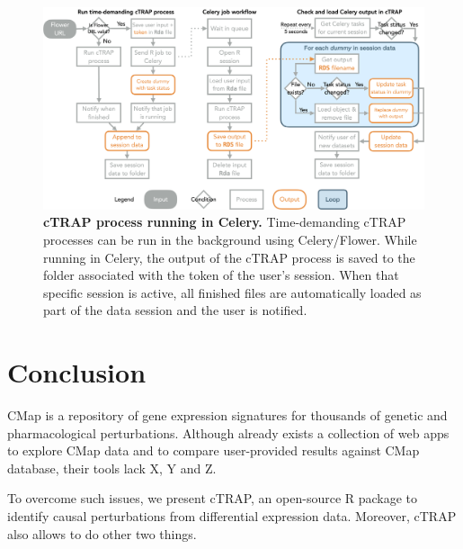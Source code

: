 \begin{figure}[!htb]
  \includegraphics[width=\textwidth]{images/ctrap/celery-job}
  \centering
  \caption[cTRAP process running in Celery]{\textbf{cTRAP process running in Celery.} Time-demanding cTRAP processes can be run in the background using Celery/Flower. While running in Celery, the output of the cTRAP process is saved to the folder associated with the token of the user's session. When that specific session is active, all finished files are automatically loaded as part of the data session and the user is notified.}
  \label{fig:ctrap-celery}
\end{figure}

\section{Conclusion}


CMap is a repository of gene expression signatures for thousands of genetic and pharmacological perturbations. Although  already exists a collection of web apps to explore CMap data and to compare user-provided results against CMap database, their tools lack X, Y and Z.

To overcome such issues, we present cTRAP, an open-source R package to identify causal perturbations from differential expression data. Moreover, cTRAP also allows to do other two things.

